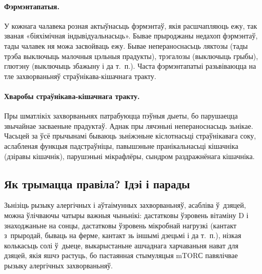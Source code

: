 \paragraph{Фэрмэнтапатыя.}
У кожнага чалавека розная актыўнасьць фэрмэнтаў, якія расшчапляюць ежу, так званая «біяхімічная індывідуальнасьць». Бывае прыроджаны недахоп фэрмэнтаў, тады чалавек ня можа засвойваць ежу. Бывае непераноснасьць ляктозы (тады трэба выключыць малочныя цэльныя прадукты), трэгалозы (выключыць грыбы), глютэну (выключыць збажыну і да т.~п.). Часта фэрмэнтапатыі разьвіваюцца на тле захворваньняў страўнікава-кішачнага тракту.


\paragraph{Хваробы страўнікава-кішачнага тракту.}
Пры шматлікіх захворваньнях патрабуюцца пэўныя дыеты, бо парушаецца звычайнае засваеньне прадуктаў. Аднак пры лячэньні непераноснасьць зьнікае. Часьцей за ўсё прычынамі бываюць зьніжэньне кіслотнасьці страўнікавага соку, аслабленая функцыя падстраўніцы, павышэньне пранікальнасьці кішачніка (дзіравы кішачнік), парушэньні мікрафлёры, сындром раздражнёнага кішачніка.

\subsection{Як трымацца правіла? Ідэі і парады}

Зьнізіць рызыку алергічных і аўтаімунных захворваньняў, асабліва ў~дзяцей, можна ўлічваючы чатыры важныя чыньнікі: дастатковы ўзровень вітаміну D і знаходжаньне на сонцы, дастатковы ўзровень мікробнай нагрузкі (кантакт з~прыродай, бываць на ферме, кантакт зь іншымі дзецьмі і да т.~п.), нізкая колькасьць солі ў~дыеце, выкарыстаньне ашчаднага харчаваньня нават для дзяцей, якія яшчэ растуць, бо пастаянная стымуляцыя mTORС павялічвае рызыку алергічных захворваньняў.

